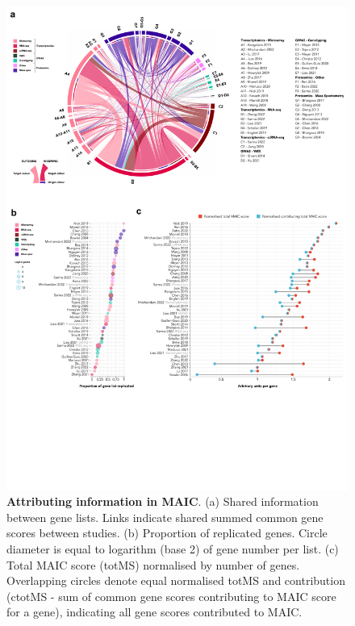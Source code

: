 \documentclass[
  11,
  a4paper,
]{article}
\begin{document}
\begin{figure}[H]

{\centering \includegraphics{../img/Supplementary_Figure_2.png}

}

\caption{\textbf{Attributing information in MAIC}. (a) Shared
information between gene lists. Links indicate shared summed common gene
scores between studies. (b) Proportion of replicated genes. Circle
diameter is equal to logarithm (base 2) of gene number per list. (c)
Total MAIC score (totMS) normalised by number of genes. Overlapping
circles denote equal normalised totMS and contribution (ctotMS - sum of
common gene scores contributing to MAIC score for a gene), indicating
all gene scores contributed to MAIC.}

\end{figure}%
\end{document}
